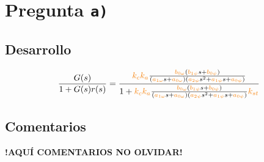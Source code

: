\section{Pregunta \texttt{a)}}\label{pregunta-a}

\subsection{Desarrollo}


\begin{equation}
  \frac{G(s)}{1 + G(s)r(s)} = \dfrac{\nara{k_ck_a} \frac{\nara{\nara{b_{0\omega}}}\left(\nara{b_{1\psi}}s + \nara{b_{0\psi}}\right)}
  {\left(\nara{a_{1\omega}}s + \nara{a_{0\omega}}\right)\left(\nara{a_{2\psi}}s^{2} + \nara{a_{1\psi}}s + \nara{a_{0\psi}}\right)}}{1+\nara{k_ck_a} \frac{\nara{\nara{b_{0\omega}}}\left(\nara{b_{1\psi}}s + \nara{b_{0\psi}}\right)}
  {\left(\nara{a_{1\omega}}s + \nara{a_{0\omega}}\right)\left(\nara{a_{2\psi}}s^{2} + \nara{a_{1\psi}}s + \nara{a_{0\psi}}\right)}\nara{k_{st}}}
\end{equation}


\FloatBarrier
\subsection{Comentarios}


\textbf{!AQUÍ COMENTARIOS NO OLVIDAR!}